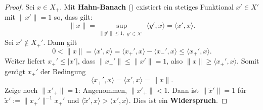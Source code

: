 \begin{proof}
Sei $x\in X_+$. Mit \textbf{Hahn-Banach} () existiert ein stetiges Funktional  $x'\in X'$ mit $\|x'\| =1$ so, dass gilt:
\begin{equation*}
    \|x\| = \sup_{\|y'\|\leq 1,\substack{y'\in X'}}\langle y', x\rangle = \langle x', x\rangle.
\end{equation*}
Sei $x'\not\in X_+'$. Dann gilt
\begin{equation*}
0 < \|x\|=\langle x', x\rangle = \langle x_+', x\rangle - \langle x_-', x\rangle\leq \langle x_+', x\rangle.
\end{equation*}
Weiter liefert $x_+'\leq |x'|$, dass    $\|x_+'\|\leq \|x'\|=1$, also $\|x\|\geq  \langle x_+', x\rangle$. Somit genügt $x_+'$ der Bedingung
\begin{equation*}
\langle x_+', x\rangle = \langle x', x \rangle = \|x\|.
\end{equation*}
Zeige noch $\|x'_+\|=1$: Angenommen, $\|x'_+\| < 1$. Dann ist $\|\widetilde{x}'\|=1$ für $\widetilde{x}':= \|x_+'\|^{-1} x_+'$  und $\langle \widetilde{x}', x\rangle> \langle x', x\rangle$. Dies ist ein \textbf{Widerspruch}.
\end{proof}



